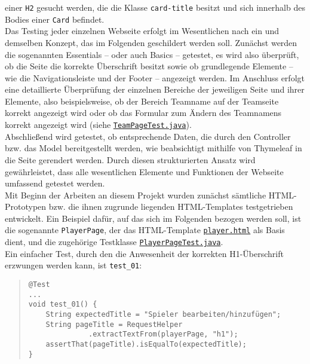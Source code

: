 einer \texttt{H2} gesucht werden, die die Klasse \texttt{card-title} besitzt und 
sich innerhalb des Bodies einer \texttt{Card} befindet. \\ 
Das Testing jeder einzelnen Webseite erfolgt im Wesentlichen nach ein und 
demselben Konzept, das im Folgenden geschildert werden soll. Zunächst werden die 
sogenannten Essentials -- oder auch Basics -- getestet, es wird also überprüft, ob 
die Seite die korrekte Überschrift besitzt sowie ob grundlegende Elemente -- wie 
die Navigationsleiste und der Footer -- angezeigt werden. Im Anschluss erfolgt eine 
detaillierte Überprüfung der einzelnen Bereiche der jeweiligen Seite und ihrer 
Elemente, also beispielsweise, ob der Bereich Teamname auf der Teamseite korrekt 
angezeigt wird oder ob das Formular zum Ändern des Teamnamens korrekt angezeigt 
wird (siehe \href{https://github.com/FlorianOhmes/bat_spielzeitenplaner/blob/main/spielzeitenplaner/src/test/java/de/bathesis/spielzeitenplaner/templates/team/TeamPageTest.java}{\texttt{TeamPageTest.java}}). \\ 
Abschließend wird getestet, ob entsprechende Daten, die durch den Controller bzw. 
das Model bereitgestellt werden, wie beabsichtigt mithilfe von Thymeleaf in die 
Seite gerendert werden. Durch diesen strukturierten Ansatz wird gewährleistet, dass 
alle wesentlichen Elemente und Funktionen der Webseite umfassend getestet 
werden. \\ 


Mit Beginn der Arbeiten an diesem Projekt wurden zunächst sämtliche HTML-Prototypen 
bzw. die ihnen zugrunde liegenden HTML-Templates testgetrieben entwickelt. Ein 
Beispiel dafür, auf das sich im Folgenden bezogen werden soll, ist die sogenannte 
\texttt{PlayerPage}, der das HTML-Template \href{https://github.com/FlorianOhmes/bat_spielzeitenplaner/blob/main/spielzeitenplaner/src/main/resources/templates/team/player.html}{\texttt{player.html}} als Basis dient, und die zugehörige 
Testklasse \href{https://github.com/FlorianOhmes/bat_spielzeitenplaner/blob/main/spielzeitenplaner/src/test/java/de/bathesis/spielzeitenplaner/templates/team/PlayerPageTest.java}{\texttt{PlayerPageTest.java}}. \\ 
Ein einfacher Test, durch den die Anwesenheit der korrekten H1-Überschrift 
erzwungen werden kann, ist \texttt{test\_01}: 

\begin{quote}
\begin{verbatim}
@Test
...
void test_01() {
    String expectedTitle = "Spieler bearbeiten/hinzufügen";
    String pageTitle = RequestHelper
              .extractTextFrom(playerPage, "h1");
    assertThat(pageTitle).isEqualTo(expectedTitle);
}
\end{verbatim}
\end{quote}

